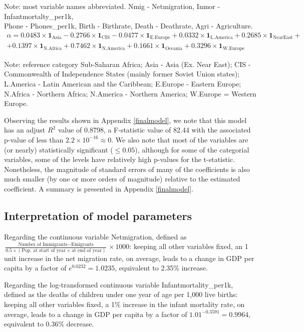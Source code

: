 \documentclass[12pt,a4paper]{article}
\renewcommand\texttt[1]{{\ttfamily\color{ttcolor}#1}}
\begin{document}
Note: most variable names abbreviated. Nmig - \texttt{Netmigration}, Inmor - \texttt{Infantmortalty\_per1k},  \\ Phone - \texttt{Phones\_per1k}, Birth - \texttt{Birthrate}, Death - \texttt{Deathrate}, Agri - \texttt{Agriculture}.
\begin{multline*}
\alpha = 0.0483 \times \mathbf{1}_\text{Asia} -0.2766 \times \mathbf{1}_\text{CIS} - 0.0477 \times \mathbf{1}_\text{E.Europe} + 0.0332  \times \mathbf{1}_\text{L.America} + 0.2685 \times  \mathbf{1}_\text{NearEast} +\\ 
+ 0.1397 \times  \mathbf{1}_\text{N.Africa} + 0.7462  \times \mathbf{1}_\text{N.America} +0.1661 \times  \mathbf{1}_\text{Oceania} + 0.3296 \times  \mathbf{1}_\text{W.Europe}
\end{multline*}

Note: reference category Sub-Saharan Africa; Asia - Asia (Ex. Near East); CIS - Commonwealth of Independence States (mainly former Soviet Union states); L.America - Latin American and the Caribbean; E.Europe - Eastern Europe; N.Africa - Northern Africa; N.America - Northern America; W.Europe = Western Europe. 

Observing the results shown in Appendix \ref{finalmodel}, we note that this model has an adjust $R^2$ value of 0.8798, a F-statistic value of 82.44 with the associated p-value of less than $2.2 \times 10^{-16} \approx 0$. We also note that most of the variables are (or nearly) statistically significant ($\leq 0.05$), although for some of the categorial variables, some of the levels have relatively high p-values for the t-statistic. Nonetheless, the magnitude of standard errors of many of the coefficients is also much smaller (by one or more orders of magnitude) relative to the estimated coefficient. A summary is presented in Appendix \ref{finalmodel}.

\subsection{Interpretation of model parameters}
 Regarding the continuous variable \texttt{Netmigration}, defined as $\frac{\text{Number of Immigrants}-\text{Emigrants}}{0.5 \times (\text{Pop. at start of year}+\text{at end of year})} \times 1000$: keeping all other variables fixed, an 1 unit increase  in the net migration rate, on average, leads to a change in GDP per capita by a factor of $e^{0.0232}=1.0235$, equivalent to 2.35\% increase. 

Regarding the log-transformed continuous variable \texttt{Infantmortality\_per1k}, defined as the deaths of children under one year of age per 1,000 live births: keeping all other variables fixed, a 1\% increase in the infant mortality rate, on average, leads to a change in GDP per capita by a factor of $1.01^{-0.3591}=0.9964$, equivalent to 0.36\% decrease.
\end{document}

